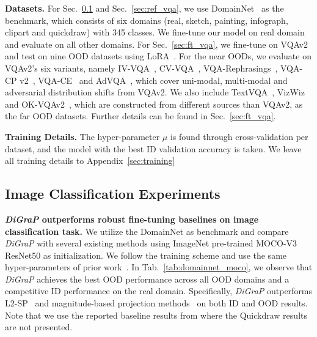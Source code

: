 \noindent \textbf{Datasets.} For Sec.~\ref{sec:img_cls} and Sec.~\ref{sec:ref_vqa}, we use DomainNet~\citep{peng2019momentmatchingmultisourcedomain} as the benchmark, which consists of six domains (real, sketch, painting, infograph, clipart and quickdraw) with 345 classes. We fine-tune our model on real domain and evaluate on all other domains. For Sec.~\ref{sec:ft_vqa}, we fine-tune on VQAv2~\citep{goyal_making_2017} and test on nine OOD datasets using LoRA~\citep{hu_lora_2021}. For the near OODs, we evaluate on VQAv2's six variants, namely IV-VQA~\citep{agarwal_towards_2020}, CV-VQA~\citep{agarwal_towards_2020}, VQA-Rephrasings~\citep{shah_cycle-consistency_2019}, VQA-CP v2~\citep{agrawal_dont_2018}, VQA-CE~\citep{dancette_beyond_2021} and AdVQA~\citep{sheng_human-adversarial_2021}, which cover uni-modal, multi-modal and adversarial distribution shifts from VQAv2. We also include TextVQA~\citep{singh_towards_2019}, VizWiz~\citep{bigham_vizwiz_nodate} and OK-VQAv2~\citep{reichman_outside_2023}, which are constructed from different sources than VQAv2, as the far OOD datasets. Further details can be found in Sec.~\ref{sec:ft_vqa}.

\noindent \textbf{Training Details.} The hyper-parameter $\mu$ is found through cross-validation per dataset, and the model with the best ID validation accuracy is taken. We leave all training details to Appendix~\ref{sec:training}

\subsection{Image Classification Experiments}
\label{sec:img_cls}
\noindent \textbf{\emph{DiGraP} outperforms robust fine-tuning baselines on image classification task.} We utilize the DomainNet as benchmark and compare \emph{DiGraP} with several existing methods using ImageNet pre-trained MOCO-V3 ResNet50 as initialization. We follow the training scheme and use the same hyper-parameters of prior work~\citep{tian_trainable_2023}. In Tab.~\ref{tab:domainnet_moco}, we observe that \emph{DiGraP} achieves the best OOD performance across all OOD domains and a competitive ID performance on the real domain. Specifically, \emph{DiGraP} outperforms L2-SP~\citep{li_explicit_2018} and magnitude-based projection methods~\citep{tian_trainable_2023,tian_fast_2023} on both ID and OOD results. Note that we use the reported baseline results from \citet{tian_fast_2023} where the Quickdraw results are not presented.

